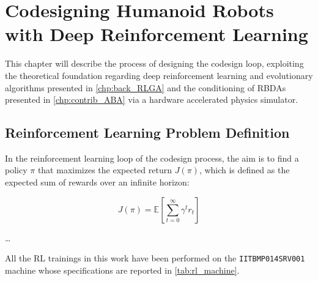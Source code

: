 \chapter{Codesigning Humanoid Robots with Deep Reinforcement Learning}
\label{chp:contrib_CodesignRL}

This chapter will describe the process of designing the codesign loop, exploiting the theoretical foundation regarding deep reinforcement learning and evolutionary algorithms presented in \cref{chp:back_RLGA} and the conditioning of \ac{RBDA}s presented in \cref{chp:contrib_ABA} via a hardware accelerated physics simulator.

\section{Reinforcement Learning Problem Definition}

In the reinforcement learning loop of the codesign process, the aim is to find a policy $\pi$ that maximizes the expected return $J(\pi)$, which is defined as the expected sum of rewards over an infinite horizon:

\begin{equation}
    J(\pi) = \mathbb{E} \left[ \sum_{t=0}^{\infty} \gamma ^t r_t \right]
\end{equation}

\dots

All the \ac{RL} trainings in this work have been performed on the \texttt{IITBMP014SRV001} machine whose specifications are reported in \cref{tab:rl_machine}.

